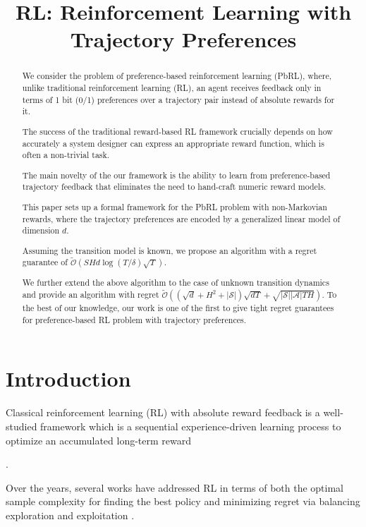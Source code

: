 \title{RL: Reinforcement Learning with Trajectory Preferences}

\begin{abstract}
We consider the problem of preference-based reinforcement learning (PbRL), where, unlike traditional reinforcement learning (RL), an agent receives feedback only in terms of 1 bit (0/1) preferences over a trajectory pair instead of absolute rewards for it.

The success of the traditional reward-based RL framework crucially depends on how accurately a system designer can express an appropriate reward function, which is often a non-trivial task.

The main novelty of the our framework is the ability to learn from preference-based trajectory feedback that eliminates the need to  hand-craft numeric reward models.  

This paper sets up a formal framework for the PbRL problem with non-Markovian rewards, where the trajectory preferences are encoded by a generalized linear model of dimension $d$. 

Assuming the transition model is known, we propose an algorithm with a regret guarantee of $\tilde {\mathcal{O}}\left( SH d  \log (T / \delta) \sqrt{T}  \right)$.

 We further extend the above algorithm to the case of unknown transition dynamics and provide an algorithm with  regret $\widetilde{\mathcal{O}}((\sqrt{d} + H^2 + |\mathcal{S}|)\sqrt{dT} +\sqrt{|\mathcal{S}||\mathcal{A}|TH} )$. To the best of our knowledge, our work is one of the first to give tight regret guarantees for preference-based RL problem with trajectory preferences.
\end{abstract}

\section{Introduction}
\label{sec:intro}

Classical reinforcement learning (RL) with absolute reward feedback is a well-studied framework which is a sequential experience-driven learning process to optimize an accumulated long-term reward 

 \citep{sutton18,ucrl,singh02}. 

Over the years, several works have addressed RL in terms of both the optimal sample complexity for finding the best policy \citep{az13,dan15,dan17,valko20,torpac} and minimizing regret via balancing exploration and exploitation  \citep{zhang19,az17,ortner20,talebi18,efroni20,domingues20}.

